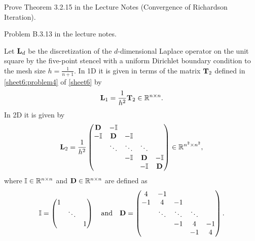 
\begin{Sheet}
  \label{sheet7}

  \begin{Problem}
    Prove Theorem 3.2.15 in the Lecture Notes (Convergence of Richardson Iteration).
  \end{Problem}

  \begin{Problem}
    Problem B.3.13 in the lecture notes.
  \end{Problem}

  \begin{Problem}[Programming]
    \label{sheet7:problem3}
    Let $\mathbf L_d$ be the discretization of the $d$-dimensional Laplace
    operator on the unit square by the five-point stencel with a
    uniform Dirichlet boundary condition to the mesh size
    $h=\frac1{n+1}$.  In 1D it is given in terms of the matrix
    $\mathbf T_2$ defined in \cref{sheet6:problem4} of \cref{sheet6} by
    \begin{gather*}
    \mathbf L_1 = \frac1{h^2}\mathbf T_2 \in\mathbb R^{n\times n}.
    \end{gather*}
    In 2D it is given by
    \begin{gather*}
    \mathbf L_2 = \frac1{h^2}
    \begin{pmatrix}
    \mathbf D &   -\mathbb I & & & \\
    -\mathbb I &  \mathbf D & -\mathbb I   & & \\
    & \ddots & \ddots & \ddots & \\
    &        &   -\mathbb I &  \mathbf D &   -\mathbb I\\
    &        &        &   -\mathbb I &  \mathbf D
    \end{pmatrix}
    \in\mathbb R^{n^2\times n^2},
    \end{gather*}
    where $\mathbb I\in\mathbb R^{n\times n}$ and $\mathbf D\in\mathbb R^{n\times n}$ are
    defined as
    \begin{gather*}
    \mathbb I =
    \begin{pmatrix}
    1 & & \\
    & \ddots & \\
    &        & 1
    \end{pmatrix}
    \quad\text{and}\quad
    \mathbf D =
    \begin{pmatrix}
    4 & -1 &    && \\
    -1 &  4 & -1 && \\
    & \ddots & \ddots & \ddots & \\
    &    & -1 & 4 & -1 \\
    &    &    & -1 & 4
    \end{pmatrix}.
    \end{gather*}
    

\end{Problem}
\end{Sheet}
